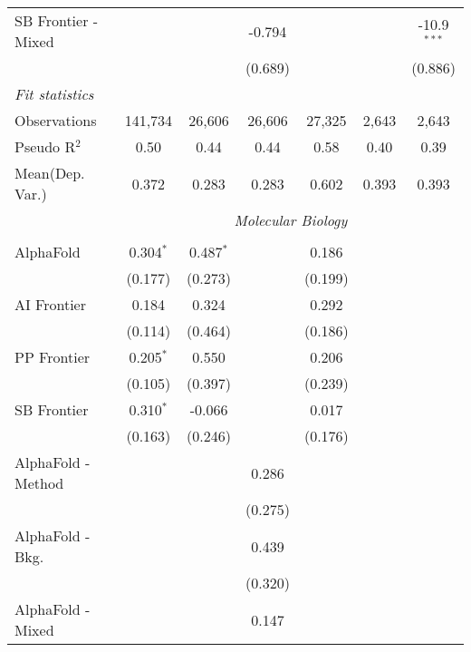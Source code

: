 \begin{tabular}{lcccccc}
   SB Frontier - Mixed  &               &               & -0.794       &               &             & -10.9$^{***}$\\   
                        &               &               & (0.689)      &               &             & (0.886)\\   
   \midrule
   \emph{Fit statistics}\\
   Observations         & 141,734       & 26,606        & 26,606       & 27,325        & 2,643       & 2,643\\  
   Pseudo R$^2$         & 0.50          & 0.44          & 0.44         & 0.58          & 0.40        & 0.39\\  
Mean(Dep. Var.) & 0.372 & 0.283 & 0.283 & 0.602 & 0.393 & 0.393 \\
   
 & \multicolumn{6}{c}{\textit{Molecular Biology}} \\ \\
   AlphaFold            & 0.304$^{*}$ & 0.487$^{*}$ &         & 0.186   &        &   \\   
                        & (0.177)     & (0.273)     &         & (0.199) &        &   \\   
   AI Frontier          & 0.184       & 0.324       &         & 0.292   &        &   \\   
                        & (0.114)     & (0.464)     &         & (0.186) &        &   \\   
   PP Frontier          & 0.205$^{*}$ & 0.550       &         & 0.206   &        &   \\   
                        & (0.105)     & (0.397)     &         & (0.239) &        &   \\   
   SB Frontier          & 0.310$^{*}$ & -0.066      &         & 0.017   &        &   \\   
                        & (0.163)     & (0.246)     &         & (0.176) &        &   \\   
   AlphaFold - Method   &             &             & 0.286   &         &        &   \\   
                        &             &             & (0.275) &         &        &   \\   
   AlphaFold - Bkg.     &             &             & 0.439   &         &        &   \\   
                        &             &             & (0.320) &         &        &   \\   
   AlphaFold - Mixed    &             &             & 0.147   &         &        &   \\   

\end{tabular}
